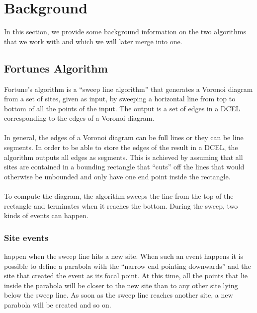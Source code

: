 \section{Background}

In this section, we provide some background information on the 
two algorithms that we work with and which we will later merge into one.

\subsection{Fortunes Algorithm}
Fortune’s algorithm is a “sweep line algorithm” that generates a Voronoi diagram from a set of sites, given as input, by sweeping a horizontal line from top to bottom of all the points of the input. The output is a set of edges in a DCEL  corresponding to the edges of a Voronoi diagram.

\paragraph{}
In general, the edges of a Voronoi diagram can be full lines or they can be line segments. In order to be able to store the edges of the result in a DCEL, the algorithm outputs all edges as segments. This is achieved by assuming that all sites are contained in a bounding rectangle that “cuts” off the lines that would otherwise be unbounded and only have one end point inside the rectangle.

\paragraph{}
To compute the diagram, the algorithm sweeps the line from the top of the rectangle and terminates when it reaches the bottom. During the sweep, two kinds of events can happen. 

\subsubsection{Site events}
happen when the sweep line hits a new site. When such an event happens it is possible to define a parabola with the “narrow end pointing downwards” and the site that created the event as its focal point. At this time, all the points that lie inside the parabola will be closer to the new site than to any other site lying below the sweep line.
As soon as the sweep line reaches another site, a new parabola will be created and so on.

